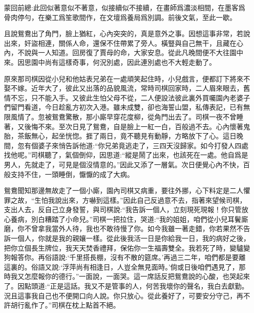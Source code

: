 

\begin{parag}
    \begin{note}蒙回前總:此回似著意似不著意，似接續似不接續，在畫師爲濃淡相間，在墨客爲骨肉停勻，在樂工爲笙歌間作，在文壇爲養局爲別調。前後文氣，至此一歇。\end{note}
\end{parag}


\begin{parag}
    且說鴛鴦出了角門，臉上猶紅，心內突突的，真是意外之事。因想這事非常，若說出來，奸盜相連，關係人命，還保不住帶累了旁人。橫豎與自己無干，且藏在心內，不說與一人知道。回房復了賈母的命，大家安息。從此凡晚間便不大往園中來。因思園中尚有這樣奇事，何況別處，因此連別處也不大輕走動了。
\end{parag}


\begin{parag}
    原來那司棋因從小兒和他姑表兄弟在一處頑笑起住時，小兒戲言，便都訂下將來不娶不嫁。近年大了，彼此又出落的品貌風流，常時司棋回家時，二人眉來眼去，舊情不忘，只不能入手。又彼此生怕父母不從，二人便設法彼此裏外買囑園內老婆子們留門看道，今日趁亂方初次入港。雖未成雙，卻也海誓山盟，私傳表記，已有無限風情了。忽被鴛鴦驚散，那小廝早穿花度柳，從角門出去了。司棋一夜不曾睡著，又後悔不來。至次日見了鴛鴦，自是臉上一紅一白，百般過不去。心內懷著鬼胎，茶飯無心，起坐恍惚。捱了兩日，竟不聽見有動靜，方略放下了心。這日晚間，忽有個婆子來悄告訴他道:“你兄弟竟逃走了，三四天沒歸家。如今打發人四處找他呢。”司棋聽了，氣個倒仰，因思道:“縱是鬧了出來，也該死在一處。他自爲是男人，先就走了，可見是個沒情意的。”因此又添了一層氣。次日便覺心內不快，百般支持不住，一頭睡倒，懨懨的成了大病。
\end{parag}


\begin{parag}
    鴛鴦聞知那邊無故走了一個小廝，園內司棋又病重，要往外挪，心下料定是二人懼罪之故，“生怕我說出來，方嚇到這樣。”因此自己反過意不去，指著來望候司棋，支出人去，反自己立身發誓，與司棋說:“我告訴一個人，立刻現死現報！你只管放心養病，別白糟踏了小命兒。”司棋一把拉住，哭道:“我的姐姐，咱們從小兒耳鬢廝磨，你不曾拿我當外人待，我也不敢待慢了你。如今我雖一著走錯，你若果然不告訴一個人，你就是我的親孃一樣。從此後我活一日是你給我一日，我的病好之後，把你立個長生牌位，我天天焚香禮拜，保佑你一生福壽雙全。我若死了時，變驢變狗報答你。再俗語說:‘千里搭長棚，沒有不散的筵席。’再過三二年，咱們都是要離這裏的。俗語又說:‘浮萍尚有相逢日，人豈全無見面時。’倘或日後咱們遇見了，那時我又怎麼報你的德行。”一面說，一面哭。這一席話反把鴛鴦說的心酸，也哭起來了。因點頭道:“正是這話。我又不是管事的人，何苦我壞你的聲名，我白去獻勤。況且這事我自己也不便開口向人說。你只放心。從此養好了，可要安分守己，再不許胡行亂作了。”司棋在枕上點首不絕。
\end{parag}


